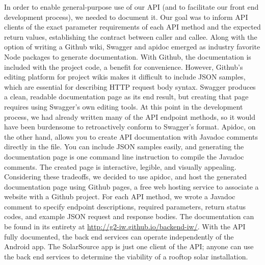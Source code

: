 \documentclass[pageno]{jpaper}
\begin{document}
In order to enable general-purpose use of our API (and to facilitate our front end development process), we needed to document it. Our goal was to inform API clients of the exact parameter requirements of each API method and the expected return values, establishing the contract between caller and callee. Along with the option of writing a Github wiki, Swagger and apidoc emerged as industry favorite Node packages to generate documentation. With Github, the documentation is included with the project code, a benefit for convenience. However, Github's editing platform for project wikis makes it difficult to include JSON samples, which are essential for describing HTTP request body syntax. Swagger produces a clean, readable documentation page as its end result, but creating that page requires using Swagger's own editing tools. At this point in the development process, we had already written many of the API endpoint methods, so it would have been burdensome to retroactively conform to Swagger's format. Apidoc, on the other hand, allows you to create API documentation with Javadoc comments directly in the file. You can include JSON samples easily, and generating the documentation page is one command line instruction to compile the Javadoc comments. The created page is interactive, legible, and visually appealing. Considering these tradeoffs, we decided to use apidoc, and host the generated documentation page using Github pages, a free web hosting service to associate a website with a Github project. For each API method, we wrote a Javadoc comment to specify endpoint descriptions, required parameters, return status codes, and example JSON request and response bodies. The documentation can be found in its entirety at \url{http://g2-iw.github.io/backend-iw/}. With the API fully documented, the back end services can operate independently of the Android app. The SolarSource app is just one client of the API; anyone can use the back end services to determine the viability of a rooftop solar installation.
\end{document}

